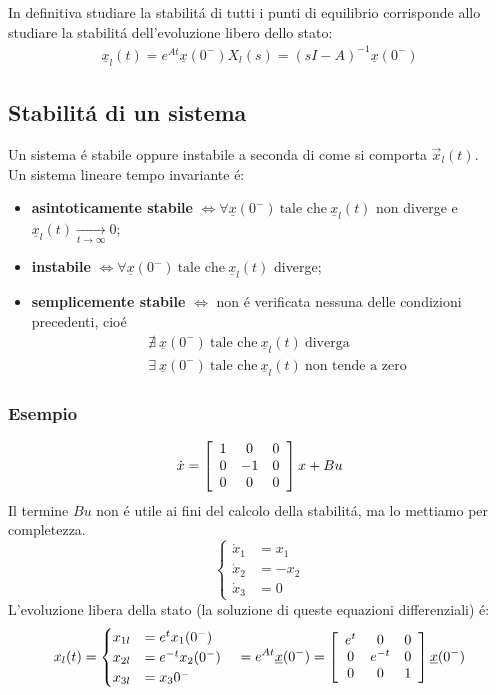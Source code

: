 \documentclass[../main.tex]{subfiles}
\begin{document}
		In definitiva studiare la stabilit\'a di tutti i punti di equilibrio corrisponde allo studiare la stabilit\'a dell'evoluzione libero dello stato:
		\begin{align*}
			\underline x_l(t) = e^{At} \underline x(0^-)
			X_l(s) = (sI-A)^{-1} \underline x(0^-)
		\end{align*}
		
	\subsection{Stabilit\'a di un sistema}
		Un sistema \'e stabile oppure instabile a seconda di come si comporta $ \vec x_l(t) $.\\
		Un sistema lineare tempo invariante \'e:
		\begin{itemize}
			\item
				\textbf{asintoticamente stabile} $ \Leftrightarrow  \forall \underline x(0^-)\ \text{tale che}\ \underline x_l(t) $ non diverge e $ \underline x_l(t) \xrightarrow[t \rightarrow \infty]{} 0 $;
			\item
				\textbf{instabile} $ \Leftrightarrow  \forall \underline x(0^-)\ \text{tale che}\ \underline x_l(t) $ diverge;
			\item
				\textbf{semplicemente stabile} $ \Leftrightarrow $ non \'e verificata nessuna delle condizioni precedenti, cio\'e
				\begin{align*}
					&\nexists\ \underline x(0^-)\ \text{tale che}\ \underline x_l(t)\ \text{diverga}\\
					&\exists\ \underline x(0^-)\ \text{tale che}\ \underline x_l(t)\ \text{non tende a zero}
				\end{align*}
		\end{itemize}
	
	\subsubsection*{Esempio}
		\begin{equation*}
			\dot x = \left[ \begin{array}{ccc} 1 & 0 & 0\\ 0 & -1 & 0\\ 0 & 0 & 0 \end{array} \right] x + Bu
		\end{equation*}
		Il termine $ Bu $ non \'e utile ai fini del calcolo della stabilit\'a, ma lo mettiamo per completezza.
		\[ 
			\begin{cases}
				\dot x_1 &= x_1\\
				\dot x_2 &= -x_2\\
				\dot x_3 &= 0
			\end{cases}
		\]
		L'evoluzione libera della stato (la soluzione di queste equazioni differenziali) \'e:
		\[ 
			x_l(t) = 
			\begin{cases}
				x_{1l} &= e^t x_1(0^-)\\
				x_{2l} &= e^{-t} x_2(0^-)\\
				x_{3l} &= x_3{0^-}
			\end{cases}
			\quad = e^{At} \underline x(0^-) = \left[ \begin{array}{ccc} e^t & 0 & 0\\ 0 & e^{-t} & 0\\ 0 & 0 & 1 \end{array} \right] \underline x(0^-)
		\]
		  
\end{document}
